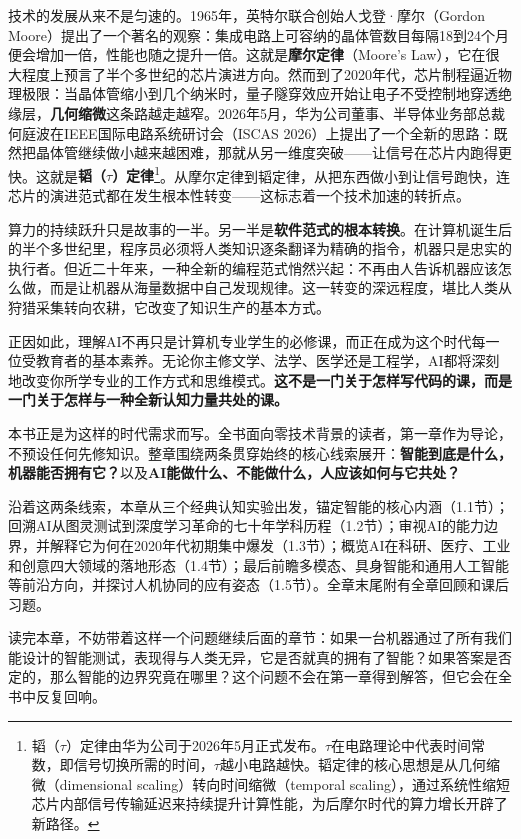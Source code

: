 技术的发展从来不是匀速的。1965年，英特尔联合创始人戈登·摩尔（Gordon Moore）提出了一个著名的观察：集成电路上可容纳的晶体管数目每隔18到24个月便会增加一倍，性能也随之提升一倍。这就是\textbf{摩尔定律}（Moore's Law），它在很大程度上预言了半个多世纪的芯片演进方向。然而到了2020年代，芯片制程逼近物理极限：当晶体管缩小到几个纳米时，量子隧穿效应开始让电子不受控制地穿透绝缘层，\textbf{几何缩微}这条路越走越窄。2026年5月，华为公司董事、半导体业务部总裁何庭波在IEEE国际电路系统研讨会（ISCAS 2026）上提出了一个全新的思路：既然把晶体管继续做小越来越困难，那就从另一维度突破——让信号在芯片内跑得更快。这就是\textbf{韬（$\tau$）定律}\footnote{韬（$\tau$）定律由华为公司于2026年5月正式发布。$\tau$在电路理论中代表时间常数，即信号切换所需的时间，$\tau$越小电路越快。韬定律的核心思想是从几何缩微（dimensional scaling）转向时间缩微（temporal scaling），通过系统性缩短芯片内部信号传输延迟来持续提升计算性能，为后摩尔时代的算力增长开辟了新路径。}。从摩尔定律到韬定律，从把东西做小到让信号跑快，连芯片的演进范式都在发生根本性转变——这标志着一个技术加速的转折点。

算力的持续跃升只是故事的一半。另一半是\textbf{软件范式的根本转换}。在计算机诞生后的半个多世纪里，程序员必须将人类知识逐条翻译为精确的指令，机器只是忠实的执行者。但近二十年来，一种全新的编程范式悄然兴起：不再由人告诉机器应该怎么做，而是让机器从海量数据中自己发现规律。这一转变的深远程度，堪比人类从狩猎采集转向农耕，它改变了知识生产的基本方式。

正因如此，理解AI不再只是计算机专业学生的必修课，而正在成为这个时代每一位受教育者的基本素养。无论你主修文学、法学、医学还是工程学，AI都将深刻地改变你所学专业的工作方式和思维模式。\textbf{这不是一门关于怎样写代码的课，而是一门关于怎样与一种全新认知力量共处的课。}

本书正是为这样的时代需求而写。全书面向零技术背景的读者，第一章作为导论，不预设任何先修知识。整章围绕两条贯穿始终的核心线索展开：\textbf{智能到底是什么，机器能否拥有它？}以及\textbf{AI能做什么、不能做什么，人应该如何与它共处？}

沿着这两条线索，本章从三个经典认知实验出发，锚定智能的核心内涵（1.1节）；回溯AI从图灵测试到深度学习革命的七十年学科历程（1.2节）；审视AI的能力边界，并解释它为何在2020年代初期集中爆发（1.3节）；概览AI在科研、医疗、工业和创意四大领域的落地形态（1.4节）；最后前瞻多模态、具身智能和通用人工智能等前沿方向，并探讨人机协同的应有姿态（1.5节）。全章末尾附有全章回顾和课后习题。

读完本章，不妨带着这样一个问题继续后面的章节：如果一台机器通过了所有我们能设计的智能测试，表现得与人类无异，它是否就真的拥有了智能？如果答案是否定的，那么智能的边界究竟在哪里？这个问题不会在第一章得到解答，但它会在全书中反复回响。

